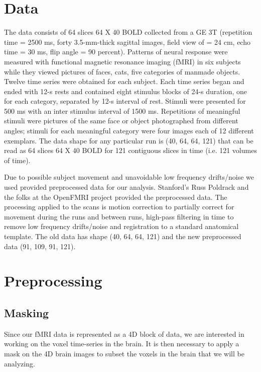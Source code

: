 \documentclass[12pt]{article}
\begin{document}
\section{Data}

The data consists of 64 slices  64 X 40 BOLD collected from a GE 3T (repetition 
time = 2500 ms, forty 3.5-mm-thick sagittal images, field view of = 24 cm, echo 
time = 30 ms, flip angle = 90 percent). Patterns of neural response were 
measured with functional magnetic resonance imaging (fMRI) in six subjects 
while they viewed pictures of faces, cats, five categories of manmade objects. 
Twelve time series were obtained for each subject. Each time series began and 
ended with 12-s rests and contained eight stimulus blocks of 24-s duration, one 
for each category, separated by 12-s interval of rest. Stimuli were presented 
for 500 ms with an inter stimulus interval of 1500 ms. Repetitions of 
meaningful stimuli were pictures of the same face or object photographed from 
different angles; stimuli for each meaningful category were four images each of 
12 different exemplars. The data shape for any particular run is (40, 64, 64, 
121) that can be read as 64 slices 64 X 40 BOLD for 121 contiguous slices in 
time (i.e. 121 volumes of time).

Due to possible subject movement and unavoidable low frequency drifts/noise we used provided preprocessed data for our analysis. Stanford’s Russ Poldrack and the folks at the OpenFMRI project provided the preprocessed data. The processing applied to the scans is motion correction to partially correct for movement during the runs and between runs, high-pass filtering in time to remove low frequency drifts/noise and registration to a standard anatomical template.  The old data has shape (40, 64, 64, 121) and the new preprocessed data (91, 109, 91, 121).

\section{Preprocessing}

\subsection{Masking}

Since our fMRI data is represented as a 4D block of data, we are interested in 
working on the voxel time-series in the brain. It is then necessary to apply a 
mask on the 4D brain images to subset the voxels in the brain that we will be 
analyzing.
\end{document}
